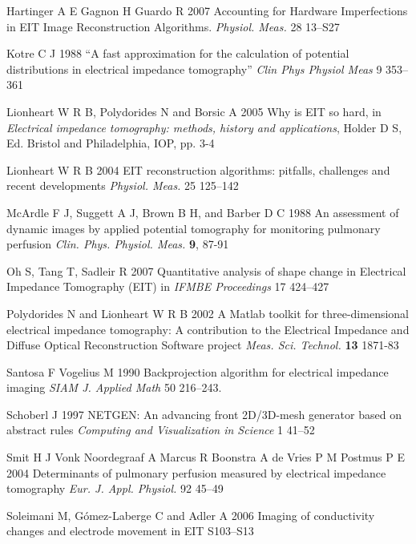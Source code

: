 \documentclass[12pt]{iopart}
\begin{document}
\item[]
Hartinger A E Gagnon H Guardo R 2007
Accounting for Hardware Imperfections in EIT Image
Reconstruction Algorithms.
{\em Physiol. Meas.}
28 13--S27
 
\item[]
Kotre C J 1988
``A fast approximation for the calculation of potential distributions in electrical impedance tomography''
{\em Clin Phys Physiol Meas}
9 353--361

\item[]
Lionheart W R B, Polydorides N and Borsic A 2005 Why is EIT so hard,
in {\em Electrical impedance tomography: methods, history and
applications}, Holder D S, Ed. Bristol and Philadelphia, IOP, pp.
3-4

\item[]
Lionheart W R B 2004
EIT reconstruction algorithms: pitfalls, challenges
and recent developments
{\em Physiol. Meas.}
25 125--142

\item[]
McArdle F J, Suggett A J, Brown B H, and Barber D C 1988 An
assessment of dynamic images by applied potential tomography for
monitoring pulmonary perfusion {\em Clin. Phys. Physiol. Meas.}
{\bf 9}, 87-91

\item[]
Oh S, Tang T, Sadleir R 2007
Quantitative analysis of shape change in Electrical Impedance Tomography (EIT)
in {\em IFMBE Proceedings}
17 424--427

\item[]
Polydorides N and Lionheart W R B 2002 A Matlab toolkit for
three-dimensional electrical impedance tomography: A contribution
to the Electrical Impedance and Diffuse Optical Reconstruction
Software project {\em Meas. Sci. Technol.} {\bf 13} 1871-83

\item[]
Santosa F Vogelius M 1990
Backprojection algorithm for electrical impedance imaging
{\em SIAM J. Applied Math}
50 216--243. 

\item[]
Schoberl J 1997
NETGEN: An advancing front 2D/3D-mesh generator based on abstract rules
{\em Computing and Visualization in Science}
1 41--52 

\item[]
Smit H J
Vonk Noordegraaf A
Marcus R
Boonstra A
de Vries P M 
Postmus P E
2004
Determinants of pulmonary perfusion measured by electrical impedance tomography
{\em Eur. J. Appl. Physiol.}
92 45--49

\item[]
Soleimani M, G\'omez-Laberge C and Adler A 2006 Imaging of
conductivity changes and electrode movement in EIT 
S103--S13
\end{document}
